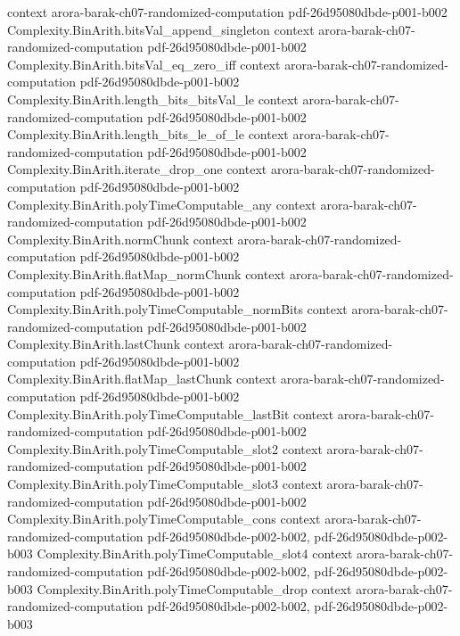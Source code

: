 \begin{theorem}
  {context}
  {arora-barak-ch07-randomized-computation}
  {pdf-26d95080dbde-p001-b002}
\proofstep
  {Complexity.BinArith.bitsVal_append_singleton}
  {context}
  {arora-barak-ch07-randomized-computation}
  {pdf-26d95080dbde-p001-b002}
\proofstep
  {Complexity.BinArith.bitsVal_eq_zero_iff}
  {context}
  {arora-barak-ch07-randomized-computation}
  {pdf-26d95080dbde-p001-b002}
\proofstep
  {Complexity.BinArith.length_bits_bitsVal_le}
  {context}
  {arora-barak-ch07-randomized-computation}
  {pdf-26d95080dbde-p001-b002}
\proofstep
  {Complexity.BinArith.length_bits_le_of_le}
  {context}
  {arora-barak-ch07-randomized-computation}
  {pdf-26d95080dbde-p001-b002}
\proofstep
  {Complexity.BinArith.iterate_drop_one}
  {context}
  {arora-barak-ch07-randomized-computation}
  {pdf-26d95080dbde-p001-b002}
\proofstep
  {Complexity.BinArith.polyTimeComputable_any}
  {context}
  {arora-barak-ch07-randomized-computation}
  {pdf-26d95080dbde-p001-b002}
\proofstep
  {Complexity.BinArith.normChunk}
  {context}
  {arora-barak-ch07-randomized-computation}
  {pdf-26d95080dbde-p001-b002}
\proofstep
  {Complexity.BinArith.flatMap_normChunk}
  {context}
  {arora-barak-ch07-randomized-computation}
  {pdf-26d95080dbde-p001-b002}
\proofstep
  {Complexity.BinArith.polyTimeComputable_normBits}
  {context}
  {arora-barak-ch07-randomized-computation}
  {pdf-26d95080dbde-p001-b002}
\proofstep
  {Complexity.BinArith.lastChunk}
  {context}
  {arora-barak-ch07-randomized-computation}
  {pdf-26d95080dbde-p001-b002}
\proofstep
  {Complexity.BinArith.flatMap_lastChunk}
  {context}
  {arora-barak-ch07-randomized-computation}
  {pdf-26d95080dbde-p001-b002}
\proofstep
  {Complexity.BinArith.polyTimeComputable_lastBit}
  {context}
  {arora-barak-ch07-randomized-computation}
  {pdf-26d95080dbde-p001-b002}
\proofstep
  {Complexity.BinArith.polyTimeComputable_slot2}
  {context}
  {arora-barak-ch07-randomized-computation}
  {pdf-26d95080dbde-p001-b002}
\proofstep
  {Complexity.BinArith.polyTimeComputable_slot3}
  {context}
  {arora-barak-ch07-randomized-computation}
  {pdf-26d95080dbde-p001-b002}
\proofstep
  {Complexity.BinArith.polyTimeComputable_cons}
  {context}
  {arora-barak-ch07-randomized-computation}
  {pdf-26d95080dbde-p002-b002,
    pdf-26d95080dbde-p002-b003}
\proofstep
  {Complexity.BinArith.polyTimeComputable_slot4}
  {context}
  {arora-barak-ch07-randomized-computation}
  {pdf-26d95080dbde-p002-b002,
    pdf-26d95080dbde-p002-b003}
\proofstep
  {Complexity.BinArith.polyTimeComputable_drop}
  {context}
  {arora-barak-ch07-randomized-computation}
  {pdf-26d95080dbde-p002-b002,
    pdf-26d95080dbde-p002-b003}

\end{theorem}
